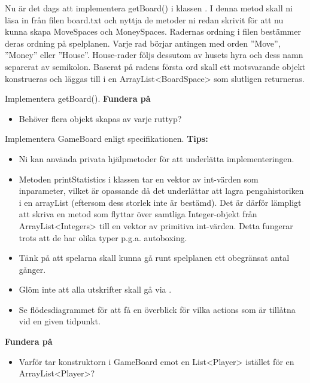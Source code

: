\Task Nu är det dags att implementera getBoard() i klassen . I denna metod skall ni läsa in från filen board.txt och nyttja de metoder ni redan skrivit för att nu kunna skapa MoveSpaces och MoneySpaces. Radernas ordning i filen bestämmer deras ordning på spelplanen. Varje rad börjar antingen med orden ''Move'', ''Money'' eller ''House''. House-rader följs dessutom av husets hyra och dess namn separerat av semikolon. Baserat på radens första ord skall ett motsvarande objekt konstrueras och läggas till i en ArrayList<BoardSpace> som slutligen returneras.



\Subtask Implementera getBoard().
\newline
\newline
\textbf{Fundera på}
\begin{itemize}
\item Behöver flera objekt skapas av varje ruttyp?
\end{itemize}

\Task Implementera GameBoard enligt specifikationen.
\newline
\newline
\textbf{Tips:}

\begin{itemize}
\item Ni kan använda privata hjälpmetoder för att underlätta implementeringen.
\item Metoden printStatistics i klassen  tar en vektor av int-värden som inparameter, vilket är opassande då det underlättar att lagra pengahistoriken i en arrayList (eftersom dess storlek inte är bestämd). Det är därför lämpligt att skriva en metod som flyttar över samtliga Integer-objekt från ArrayList<Integers> till en vektor av primitiva int-värden. Detta fungerar trots att de har olika typer p.g.a. autoboxing. 
\item Tänk på att spelarna skall kunna gå runt spelplanen ett obegränsat antal gånger.
\item Glöm inte att alla utskrifter skall gå via  .
\item Se flödesdiagrammet för att få en överblick för vilka actions som är tillåtna vid en given tidpunkt.
\end{itemize}

\textbf{Fundera på}
\begin{itemize}
\item Varför tar konstruktorn i GameBoard emot en List<Player> istället för en ArrayList<Player>?
\end{itemize}

